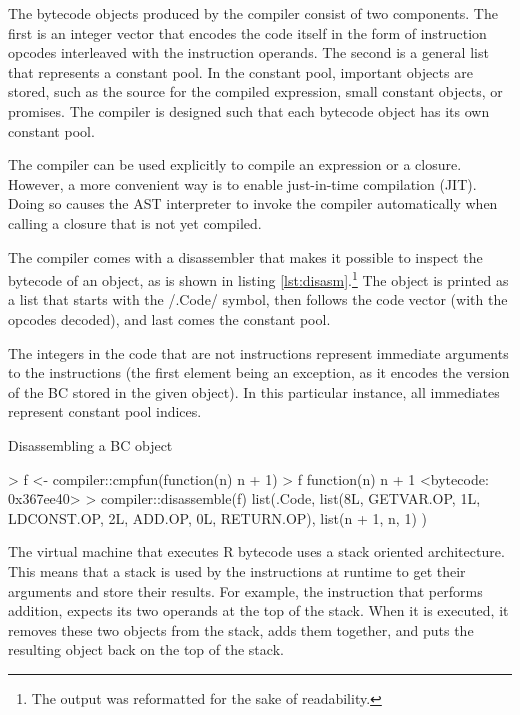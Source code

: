 {The bytecode objects produced by the compiler consist of two components. The first is an integer vector that encodes the code itself in the form of instruction opcodes interleaved with the instruction operands. The second is a general list that represents a constant pool. In the constant pool, important objects are stored, such as the source for the compiled expression, small constant objects, or promises. The compiler is designed such that each bytecode object has its own constant pool.

The compiler can be used explicitly to compile an expression or a closure. However, a more convenient way is to enable just-in-time compilation (JIT). Doing so causes the AST interpreter to invoke the compiler automatically when calling a closure that is not yet compiled.

The compiler comes with a disassembler that makes it possible to inspect the bytecode of an object, as is shown in listing \ref{lst:disasm}.\footnote{The output was reformatted for the sake of readability.} The object is printed as a list that starts with the \rinline/.Code/ symbol, then follows the code vector (with the opcodes decoded), and last comes the constant pool.

The integers in the code that are not instructions represent immediate arguments to the instructions (the first element being an exception, as it encodes the version of the BC stored in the given object). In this particular instance, all immediates represent constant pool indices.

\begin{listing}[htbp]
  \caption{\label{lst:disasm}Disassembling a BC object}
  \begin{rcode}
> f <- compiler::cmpfun(function(n) n + 1)
> f
function(n) n + 1
<bytecode: 0x367ee40>
> compiler::disassemble(f)
list(.Code,
     list(8L,
          GETVAR.OP, 1L,
          LDCONST.OP, 2L,
          ADD.OP, 0L,
          RETURN.OP),
     list(n + 1,
          n,
          1)
)
  \end{rcode}
\end{listing}

The virtual machine that executes R bytecode uses a stack oriented architecture. This means that a stack is used by the instructions at runtime to get their arguments and store their results. For example, the instruction that performs addition, expects its two operands at the top of the stack. When it is executed, it removes these two objects from the stack, adds them together, and puts the resulting object back on the top of the stack.

}
